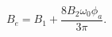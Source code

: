 \begin{equation} \label{eq:B_e_equation}
B_{e} = B_{1} + \frac{8 B_{2} \omega_{0} \phi_{a}}{3 \pi}.
\end{equation}
